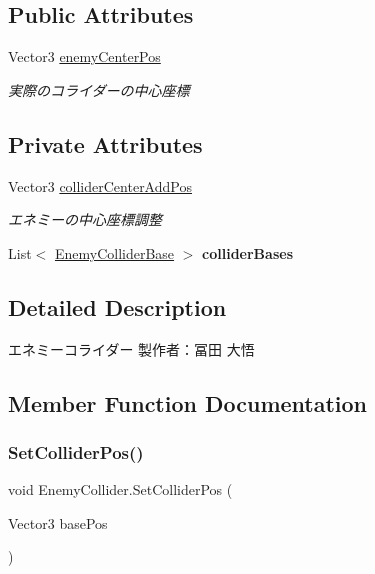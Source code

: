\subsection*{Public Attributes}
\begin{DoxyCompactItemize}
\item 
Vector3 \hyperlink{class_enemy_collider_a3e048a434677711efec8d3951381f2e2}{enemy\+Center\+Pos}
\begin{DoxyCompactList}\small\item\em 実際のコライダーの中心座標 \end{DoxyCompactList}\end{DoxyCompactItemize}
\subsection*{Private Attributes}
\begin{DoxyCompactItemize}
\item 
Vector3 \hyperlink{class_enemy_collider_a8dcf6577b63427f93bde06c22b9fffcf}{collider\+Center\+Add\+Pos}
\begin{DoxyCompactList}\small\item\em エネミーの中心座標調整 \end{DoxyCompactList}\item 
\mbox{\label{class_enemy_collider_a4c486c669bcb41bb019767b591bcd060}} 
List$<$ \hyperlink{class_enemy_collider_1_1_enemy_collider_base}{Enemy\+Collider\+Base} $>$ {\bfseries collider\+Bases}
\end{DoxyCompactItemize}


\subsection{Detailed Description}
エネミーコライダー 製作者：冨田 大悟 



\subsection{Member Function Documentation}
\mbox{\label{class_enemy_collider_ab984266faa7320cb7b4bf0ce508eceb9}} 
\subsubsection{\texorpdfstring{Set\+Collider\+Pos()}{SetColliderPos()}}
{\footnotesize\ttfamily void Enemy\+Collider.\+Set\+Collider\+Pos (\begin{DoxyParamCaption}\item[{Vector3}]{base\+Pos }\end{DoxyParamCaption})\hspace{0.3cm}{\ttfamily [inline]}}



